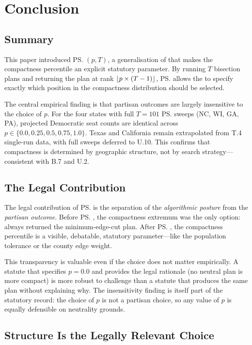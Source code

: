 \section{Conclusion}
\label{sec:conclusion}

\subsection{Summary}

This paper introduced \ps{}$(p, T)$, a generalisation of \cs{} that makes
the compactness percentile an explicit statutory parameter.
By running $T$ bisection plans and returning the plan at rank $\lfloor p
\times (T-1) \rfloor$, \ps{} allows the \dia{} to specify exactly which position in
the compactness distribution should be selected.

The central empirical finding is that partisan outcomes are largely
insensitive to the choice of $p$.
For the four states with full $T = 101$ \ps{} sweeps (NC, WI, GA, PA),
projected Democratic seat counts are identical across
$p \in \{0.0, 0.25, 0.5, 0.75, 1.0\}$.
Texas and California remain extrapolated from T.4 single-run data, with
full sweeps deferred to U.10.
This confirms that compactness is determined by geographic structure, not by
search strategy---consistent with B.7 and U.2.

\subsection{The Legal Contribution}

The legal contribution of \ps{} is the separation of the \emph{algorithmic
posture} from the \emph{partisan outcome}.
Before \ps{}, the compactness extremum was the only option: \cs{} always
returned the minimum-edge-cut plan.
After \ps{}, the compactness percentile is a visible, debatable, statutory
parameter---like the population tolerance or the county edge weight.

This transparency is valuable even if the choice does not matter empirically.
A statute that specifies $p = 0.0$ and provides the legal rationale (no
neutral plan is more compact) is more robust to challenge than a statute
that produces the same plan without explaining why.
The insensitivity finding is itself part of the statutory record: the choice
of $p$ is not a partisan choice, so any value of $p$ is equally defensible
on neutrality grounds.

\subsection{Structure Is the Legally Relevant Choice}

